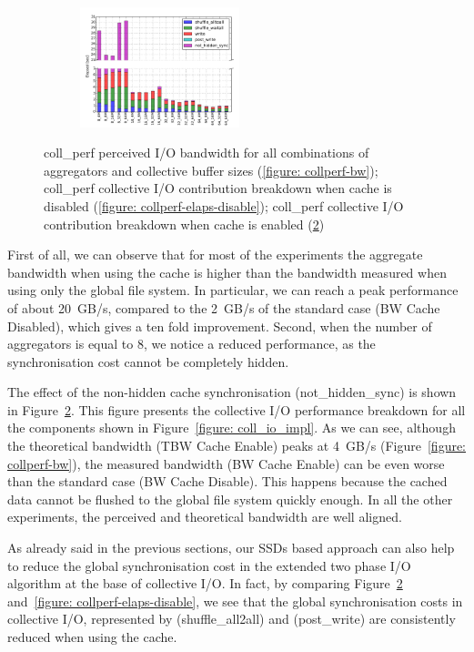 \begin{figure}[!htb]
  \begin{subfigure}[b]{\textwidth}
  \centering
  \includegraphics[width=0.51\textwidth]{chapters/chapter3/figures/coll_perf_32GB_30sec_elapsed_enable}
  \caption{}
  \label{figure: collperf-elaps-enable}
  \end{subfigure}
  \caption{coll\_perf perceived I/O bandwidth for all combinations of aggregators and collective buffer sizes (\ref{figure: collperf-bw}); coll\_perf collective I/O contribution breakdown when cache is disabled (\ref{figure: collperf-elaps-disable}); coll\_perf collective I/O contribution breakdown when cache is enabled (\ref{figure: collperf-elaps-enable})}
\end{figure}
First of all, we can observe that for most of the experiments the aggregate bandwidth when using the cache is higher than the bandwidth measured when using only the global file system. In particular, we can reach a peak performance of about 20~GB/s, compared to the 2~GB/s of the standard case (BW Cache Disabled), which gives a ten fold improvement. Second, when the number of aggregators is equal to 8, we notice a reduced performance, as the synchronisation cost cannot be completely hidden.

The effect of the non-hidden cache synchronisation (not\_hidden\_sync) is shown in Figure~\ref{figure: collperf-elaps-enable}. This figure presents the collective I/O performance breakdown for all the components shown in Figure~\ref{figure: coll_io_impl}. As we can see, although the theoretical bandwidth (TBW Cache Enable) peaks at 4~GB/s (Figure~\ref{figure: collperf-bw}), the measured bandwidth (BW Cache Enable) can be even worse than the standard case (BW Cache Disable). This happens because the cached data cannot be flushed to the global file system quickly enough. In all the other experiments, the perceived and theoretical bandwidth are well aligned.

As already said in the previous sections, our SSDs based approach can also help to reduce the global synchronisation cost in the extended two phase I/O algorithm at the base of collective I/O.
In fact, by comparing Figure~\ref{figure: collperf-elaps-enable} and~\ref{figure: collperf-elaps-disable}, we see that the global synchronisation costs in collective I/O, represented by  (shuffle\_all2all) and  (post\_write) are consistently reduced when using the cache.

